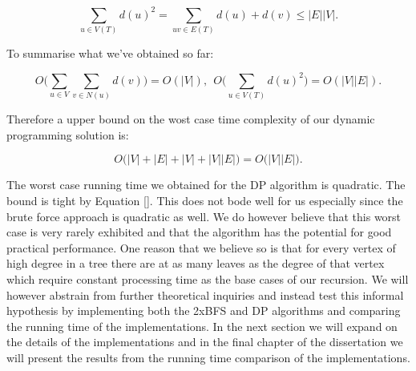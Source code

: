 $$ \sum_{u \in V(T)}{d(u)^2} = \sum_{uv \in E(T)}{d(u) + d(v)} \le |E||V| .$$

To summarise what we've obtained so far:

$$ O\bigg( \sum_{u \in V}{\sum_{v \in N(u)}{d(v)}} \bigg) = O(|V|)  , ~~ O\bigg( \sum_{u \in V(T)}{d(u)^2} \bigg) = O(|V||E|).$$

Therefore a upper bound on the wost case time complexity of our dynamic programming solution is:

$$ O\big( |V| + |E| + |V| + |V||E|  \big) = O\big(|V||E|\big).$$

The worst case running time we obtained for the DP algorithm is quadratic. The bound is tight by Equation []. This does not bode well for us especially since the brute force approach is quadratic as well. We do however believe that this worst case is very rarely exhibited and that the algorithm has the potential for good practical performance. One reason that we believe so is that for every vertex of high degree in a tree there are at as many leaves as the degree of that vertex which require constant processing time as the base cases of our recursion. We will however abstrain from further theoretical inquiries and instead test this informal hypothesis by implementing both the 2xBFS and DP algorithms and comparing the running time of the implementations. In the next section we will expand on the details of the implementations and in the final chapter of the dissertation we will present the results from the running time comparison of the implementations.


